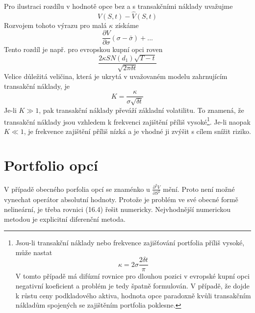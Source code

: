 \documentclass[a4paper]{book}
\begin{document}
Pro ilustraci rozdílu v hodnotě opce bez a s transakčními náklady uvažujme
\begin{equation*}
V(S,t) - \hat{V}(S,t)
\end{equation*}
Rozvojem tohoto výrazu pro malá $\kappa$ získáme
\begin{equation*}
\frac{\partial V}{\partial \sigma}(\sigma - \bar{\sigma}) + ...
\end{equation*}
Tento rozdíl je např. pro evropskou kupní opci roven
\begin{equation*}
\frac{2 \kappa S N(d_1) \sqrt{T - t}}{\sqrt{2 \pi \delta t}}
\end{equation*}
Velice důležitá veličina, která je ukrytá v uvažovaném modelu zahrnujícím transakční náklady, je
\begin{equation*}
K = \frac{\kappa}{\sigma \sqrt{\delta t}}
\end{equation*}
Je-li $K \gg 1$, pak transakční náklady převáží základní volatilitu. To znamená, že transakční náklady jsou vzhledem k frekvenci zajištění příliš vysoké\footnote{Jsou-li transakční náklady nebo frekvence zajišťování portfolia příliš vysoké, může nastat
\begin{equation*}
\kappa = 2 \sigma \frac{2 \delta t}{\pi}
\end{equation*}
V tomto případě má difúzní rovnice pro dlouhou pozici v evropské kupní opci negativní koeficient a problém je tedy špatně formulován. V případě, že dojde k růstu ceny podkladového aktiva, hodnota opce paradoxně kvůli transakčním nákladům spojených se zajištěním portfolia poklesne.}. Je-li naopak $K \ll 1$, je frekvence zajištění příliš nízká a je vhodné ji zvýšit s cílem snížit riziko.

\section{Portfolio opcí}

V případě obecného porfolia opcí se znaménko u $\frac{\partial^2 V}{\partial S^2}$ mění. Proto není možné vynechat operátor absolutní hodnoty. Protože je problém ve své obecné formě nelineární, je třeba rovnici (16.4) řešit numericky. Nejvhodnější numerickou metodou je explicitní diferenční metoda.
\end{document}
